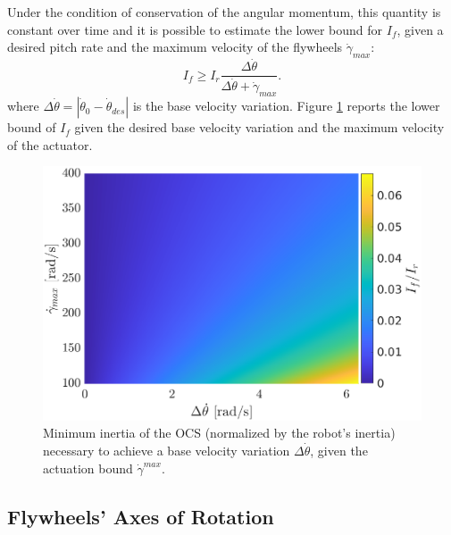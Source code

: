 \documentclass[sensors,article,accept,pdftex,moreauthors]{Definitions/mdpi}
\begin{document}
Under the condition of conservation of the angular momentum, this quantity is constant over time and it is possible to estimate the lower bound for $I_{f}$, given a desired pitch rate and the maximum velocity of the flywheels $\dot{\gamma}_{max}$:
\begin{equation}
I_{f} \geq I_r \dfrac{ \Delta \dot{\theta} }{\Delta \dot{\theta}+\dot{\gamma}_{max}}.
\end{equation}
where $\Delta \dot{\theta} =  \left\lvert \dot{\theta}_0-\dot{\theta}_{des} \right\rvert$ is the base velocity variation.
Figure \ref{fig:inertia_limits} reports the lower bound of $I_{f}$ given the desired base velocity variation and the maximum velocity of the actuator.

\vspace{-9pt}

\begin{figure}[H]%
	 
	\includegraphics[width=.8\linewidth]{figures/lowerbound2.eps}
	\caption{\small Minimum inertia of the OCS (normalized by the robot's inertia) necessary to achieve a base velocity variation $\Delta \dot{\theta}$, given the actuation bound $\dot \gamma^{max}$.}
	\label{fig:inertia_limits}
\end{figure}



\subsection{Flywheels' Axes of Rotation}
\label{subseq:flywheel_axes}
\end{document}
